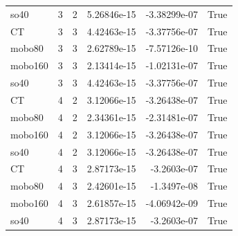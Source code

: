 \begin{tabular}{lrrrrr}
so40 & 3 & 2 & 5.26846e-15 & -3.38299e-07 & True \\
CT & 3 & 3 & 4.42463e-15 & -3.37756e-07 & True \\
mobo80 & 3 & 3 & 2.62789e-15 & -7.57126e-10 & True \\
mobo160 & 3 & 3 & 2.13414e-15 & -1.02131e-07 & True \\
so40 & 3 & 3 & 4.42463e-15 & -3.37756e-07 & True \\
CT & 4 & 2 & 3.12066e-15 & -3.26438e-07 & True \\
mobo80 & 4 & 2 & 2.34361e-15 & -2.31481e-07 & True \\
mobo160 & 4 & 2 & 3.12066e-15 & -3.26438e-07 & True \\
so40 & 4 & 2 & 3.12066e-15 & -3.26438e-07 & True \\
CT & 4 & 3 & 2.87173e-15 & -3.2603e-07 & True \\
mobo80 & 4 & 3 & 2.42601e-15 & -1.3497e-08 & True \\
mobo160 & 4 & 3 & 2.61857e-15 & -4.06942e-09 & True \\
so40 & 4 & 3 & 2.87173e-15 & -3.2603e-07 & True \\
\bottomrule
\end{tabular}
